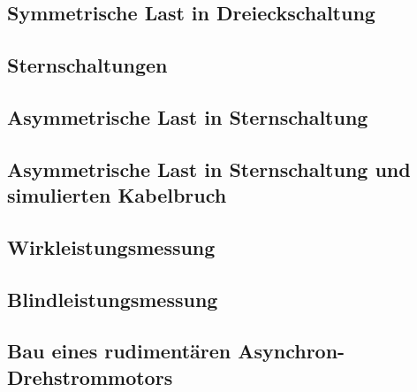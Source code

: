 \documentclass[12pt,english,ngerman]{scrartcl}
\begin{document}
\subsection{Symmetrische Last in Dreieckschaltung}

\subsection{Sternschaltungen}

\subsection{Asymmetrische Last in Sternschaltung}

\subsection{Asymmetrische Last in Sternschaltung und simulierten Kabelbruch}

\subsection{Wirkleistungsmessung}

\subsection{Blindleistungsmessung}

\subsection{Bau eines rudimentären Asynchron-Drehstrommotors}

\newpage

\printbibliography
\listoffigures
\listoftables
\end{document}
